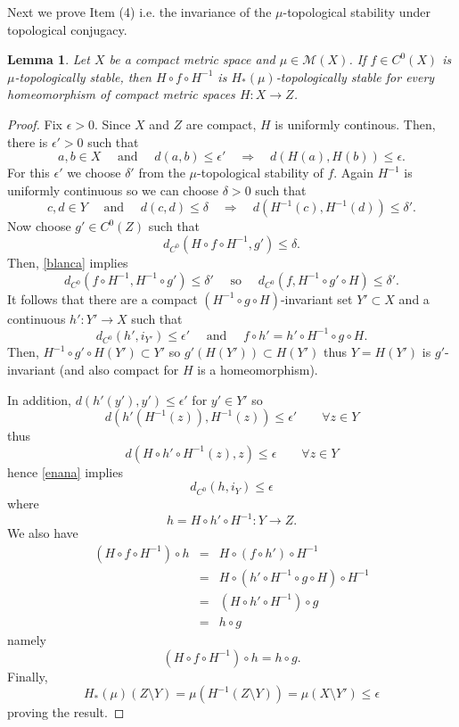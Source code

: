 \documentclass[11pt,letterpaper]{amsart}
\theoremstyle{plain}
\newtheorem{lemma}{Lemma}
\begin{document}
Next we prove Item (4) i.e. the invariance of the $\mu$-topological stability under topological conjugacy.

\begin{lemma}
\label{invariance}
Let $X$ be a compact metric space and $\mu\in \mathcal{M}(X)$.
If $f\in C^0(X)$ is $\mu$-topologically stable, then $H\circ f\circ H^{-1}$ is $H_*(\mu)$-topologically stable for every homeomorphism of compact metric spaces $H:X\to Z$.
\end{lemma}

\begin{proof}
Fix $\epsilon>0$. Since $X$ and $Z$ are compact, $H$ is uniformly continous. Then, there is $\epsilon'>0$ such that
\begin{equation}
\label{enana}
a,b\in X\quad\mbox{ and }\quad d(a,b)\leq \epsilon'\quad\Longrightarrow\quad d(H(a),H(b))\leq\epsilon.
\end{equation}
For this $\epsilon'$ we choose $\delta'$ from the $\mu$-topological stability of $f$.
Again $H^{-1}$ is uniformly continuous so we can choose $\delta>0$ such that
\begin{equation}
\label{blanca}
c,d\in Y\quad\mbox{ and }\quad d(c,d)\leq \delta\quad\Longrightarrow\quad d(H^{-1}(c),H^{-1}(d))\leq\delta'.
\end{equation}
Now choose $g'\in C^0(Z)$ such that
$$
d_{C^0}(H\circ f\circ H^{-1},g')\leq\delta.
$$
Then, \eqref{blanca} implies
$$
d_{C^0}(f\circ H^{-1},H^{-1}\circ g')\leq\delta'\quad \mbox{ so }\quad d_{C^0}(f,H^{-1}\circ g'\circ H)\leq \delta'.
$$
It follows that there are a compact $(H^{-1}\circ g\circ H)$-invariant set $Y'\subset X$ and a continuous $h':Y'\to X$ such that
$$
d_{C^0}(h',i_{Y'})\leq \epsilon'\quad\mbox{ and }\quad f\circ h'=h'\circ H^{-1}\circ g\circ H.
$$
Then,
$H^{-1}\circ g'\circ H(Y')\subset Y'$ so $g'(H(Y'))\subset H(Y')$
thus $Y=H(Y')$ is $g'$-invariant
(and also compact for $H$ is a homeomorphism).

In addition,
$d(h'(y'),y')\leq \epsilon'$ for $y'\in Y'$ so
$$
d(h'(H^{-1}(z)),H^{-1}(z))\leq\epsilon'\quad\quad\forall z\in Y
$$
thus 
$$
d(H\circ h'\circ H^{-1}(z),z)\leq\epsilon\quad\quad\forall z\in Y
$$
hence \eqref{enana} implies
$$
d_{C^0}(h,i_Y)\leq \epsilon
$$
where
$$
h=H\circ h'\circ H^{-1}:Y\to Z.
$$
We also have
\begin{eqnarray*}
(H\circ f\circ H^{-1})\circ h & = & H\circ (f\circ h')\circ H^{-1}\\
& = & H\circ (h'\circ H^{-1}\circ g\circ H)\circ H^{-1}\\
& = & (H\circ h'\circ H^{-1})\circ g\\
& = & h\circ g
\end{eqnarray*}
namely
$$
(H\circ f\circ H^{-1})\circ h=h\circ g.
$$
Finally,
$$
H_*(\mu)(Z\setminus Y)=\mu(H^{-1}(Z\setminus Y))=\mu(X\setminus Y')\leq \epsilon
$$
proving the result.
\end{proof}
\end{document}
